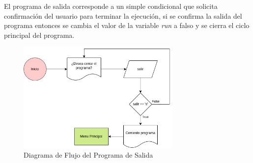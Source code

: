 \documentclass{article}
\begin{document}
El programa de salida corresponde a un simple condicional que solicita confirmación del usuario para terminar la ejecución, si se confirma la salida del programa entonces se cambia el valor de la variable \emph{run} a falso y se cierra el ciclo principal del programa.

\begin{figure}[H]
    \centering
    \includegraphics[width=8cm]{programa_salida}
    \caption{Diagrama de Flujo del Programa de Salida}
\end{figure}
\end{document}

